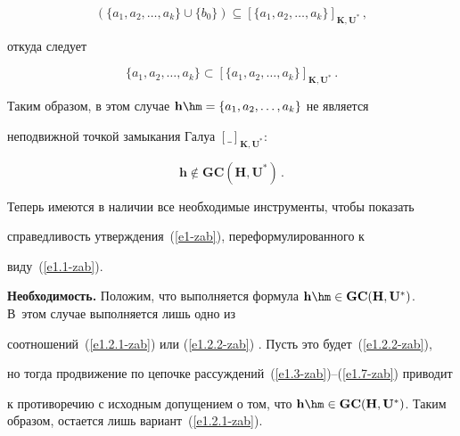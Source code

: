 \begin{equation}

\left(\{a_1, a_2, \ldots , a_k\} \cup \{ b_0\}\right) \subseteq [\{a_1, a_2, \ldots , 

a_k\}]_{\mathbf{K},\mathbf{U}^*}\,,

\label{e1.5-zab}

\end{equation}

откуда следует

\begin{equation}

\{a_1, a_2, \ldots , a_k\} \subset [\{a_1, a_2, \ldots , a_k\}]_{\mathbf{K},\mathbf{U}^*}\,.

\label{e1.6-zab}

\end{equation}

Таким образом, в этом случае $\mathbf{h}\hm = \{a_1, a_2, \ldots , a_k\}$ не является 

неподвижной точкой замыкания Галуа $[\_]_{\mathbf{K},\mathbf{U}^*}$:

\begin{equation}

\mathbf{h}\not\in \mathbf{GC}(\mathbf{H}, \mathbf{U}^*)\,.

\label{e1.7-zab}

\end{equation}

Теперь имеются в наличии все необходимые инструменты, чтобы показать 

справедливость утверждения~(\ref{e1-zab}), переформулированного к 

виду~(\ref{e1.1-zab}).



\medskip



\noindent

\textbf{Необходимость.} Положим, что выполняется формула $\mathbf{h}\hm\in 

\mathbf{GC}(\mathbf{H}, \mathbf{U}^*)$. В~этом случае выполняется лишь одно из 

соотношений~(\ref{e1.2.1-zab}) или (\ref{e1.2.2-zab}) . Пусть это будет~(\ref{e1.2.2-zab}), 

но тогда продвижение по цепочке рассуждений~(\ref{e1.3-zab})--(\ref{e1.7-zab}) приводит 

к противоречию с исходным допущением о том, что $\mathbf{h}\hm\in 

\mathbf{GC}(\mathbf{H},\mathbf{U}^*)$. Таким образом, остается лишь вариант~(\ref{e1.2.1-zab}).


